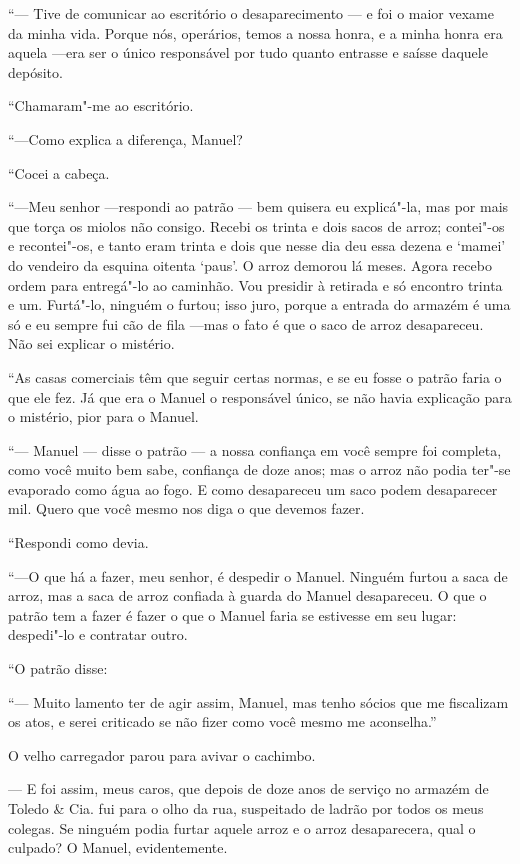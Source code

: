 ``--- Tive de comunicar ao escritório o desaparecimento --- e foi o
maior vexame da minha vida. Porque nós, operários, temos a nossa honra,
e a minha honra era aquela ---era ser o único responsável por tudo
quanto entrasse e saísse daquele depósito.

``Chamaram"-me ao escritório.

``---Como explica a diferença, Manuel?

``Cocei a cabeça.

``---Meu senhor ---respondi ao patrão --- bem quisera eu explicá"-la, mas
por mais que torça os miolos não consigo. Recebi os trinta e dois sacos
de arroz; contei"-os e recontei"-os, e tanto eram trinta e dois que nesse
dia deu essa dezena e `mamei' do vendeiro da esquina oitenta `paus'. O
arroz demorou lá meses. Agora recebo ordem para entregá"-lo ao caminhão.
Vou presidir à retirada e só encontro trinta e um. Furtá"-lo, ninguém o
furtou; isso juro, porque a entrada do armazém é uma só e eu sempre fui
cão de fila ---mas o fato é que o saco de arroz desapareceu. Não sei
explicar o mistério.

``As casas comerciais têm que seguir certas normas, e se eu fosse o
patrão faria o que ele fez. Já que era o Manuel o responsável único, se
não havia explicação para o mistério, pior para o Manuel.

``--- Manuel --- disse o patrão --- a nossa confiança em você sempre foi
completa, como você muito bem sabe, confiança de doze anos; mas o arroz
não podia ter"-se evaporado como água ao fogo. E como desapareceu um saco
podem desaparecer mil. Quero que você mesmo nos diga o que devemos
fazer.

``Respondi como devia.

``---O que há a fazer, meu senhor, é despedir o Manuel. Ninguém furtou a
saca de arroz, mas a saca de arroz confiada à guarda do Manuel
desapareceu. O que o patrão tem a fazer é fazer o que o Manuel faria se
estivesse em seu lugar: despedi"-lo e contratar outro.

``O patrão disse:

``--- Muito lamento ter de agir assim, Manuel, mas tenho sócios que me
fiscalizam os atos, e serei criticado se não fizer como você mesmo me
aconselha.''

O velho carregador parou para avivar o cachimbo.

--- E foi assim, meus caros, que depois de doze anos de serviço no
armazém de Toledo \& Cia. fui para o olho da rua, suspeitado de ladrão
por todos os meus colegas. Se ninguém podia furtar aquele arroz e o
arroz desaparecera, qual o culpado? O Manuel, evidentemente.

